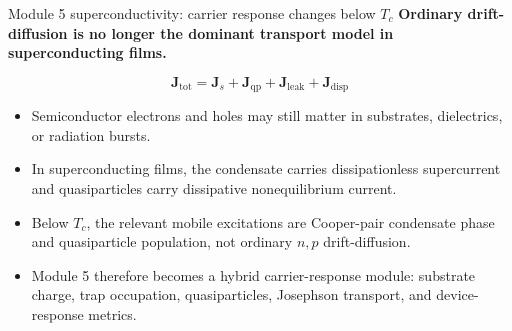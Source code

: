 \documentclass[aspectratio=169,10pt]{beamer}
\begin{document}
\begin{frame}{Module 5 superconductivity: carrier response changes below $T_c$}
\small
\textbf{Ordinary drift-diffusion is no longer the dominant transport model in superconducting films.}

\vspace{0.15em}
\begin{equation*}
\boxed{
\mathbf J_{\mathrm{tot}}
=\mathbf J_s+\mathbf J_{\mathrm{qp}}+\mathbf J_{\mathrm{leak}}+\mathbf J_{\mathrm{disp}}
}
\end{equation*}

\vspace{-0.15em}
\begin{itemize}
    \item Semiconductor electrons and holes may still matter in substrates, dielectrics, or radiation bursts.
    \item In superconducting films, the condensate carries dissipationless supercurrent and quasiparticles carry dissipative nonequilibrium current.
    \item Below $T_c$, the relevant mobile excitations are Cooper-pair condensate phase and quasiparticle population, not ordinary $n,p$ drift-diffusion.
    \item Module 5 therefore becomes a hybrid carrier-response module: substrate charge, trap occupation, quasiparticles, Josephson transport, and device-response metrics.
\end{itemize}
\end{frame}
\end{document}
